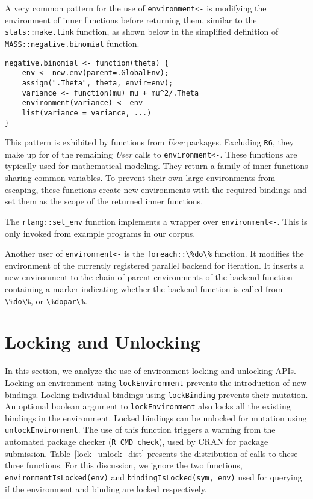 \documentclass[10pt,review,sigplan,anonymous=true,authorversion=true,nonacm=true]{acmart}
\renewcommand{\c}[1]{\lstinline |#1|\xspace}
\begin{document}
A very common pattern for the use of \c{environment<-} is modifying the
environment of inner functions before returning them, similar to the
\c{stats::make.link} function, as shown below in the simplified definition of
\c{MASS::negative.binomial} function.

\begin{lstlisting}
negative.binomial <- function(theta) {
    env <- new.env(parent=.GlobalEnv);
    assign(".Theta", theta, envir=env);
    variance <- function(mu) mu + mu^2/.Theta
    environment(variance) <- env
    list(variance = variance, ...)
}

\end{lstlisting}

This pattern is exhibited by \EnvAsnUserInnerFunFunCnt functions from
\EnvAsnUserInnerFunPackCnt \emph{User} packages. Excluding \c{R6}, they make up
for \EnvAsnUserInnerFunCallPerc of the remaining \emph{User} calls to
\c{environment<-}. These functions are typically used for mathematical modeling.
They return a family of inner functions sharing common variables. To prevent
their own large environments from escaping, these functions create new
environments with the required bindings and set them as the scope of the
returned inner functions.

The \c{rlang::set_env} function implements a wrapper over \c{environment<-}.
This is only invoked from example programs in our corpus.

Another user of \c{environment<-} is the \c{foreach::\%do\%} function. It
modifies the environment of the currently registered parallel backend for
iteration. It inserts a new environment to the chain of parent environments of
the backend function containing a marker indicating whether the backend function
is called from \c{\%do\%}, or \c{\%dopar\%}.

\section{Locking and Unlocking}

In this section, we analyze the use of environment locking and unlocking APIs.
Locking an environment using \c{lockEnvironment} prevents the introduction of
new bindings. Locking individual bindings using \c{lockBinding} prevents their
mutation. An optional boolean argument to \c{lockEnvironment} also locks all the
existing bindings in the environment. Locked bindings can be unlocked for
mutation using \c{unlockEnvironment}. The use of this function triggers a
warning from the automated package checker (\c{R CMD check}), used by CRAN for
package submission. Table~\ref{lock_unlock_dist} presents the distribution of
calls to these three functions. For this discussion, we ignore the two
functions, \c{environmentIsLocked(env)} and \c{bindingIsLocked(sym, env)} used
for querying if the environment and binding are locked respectively.
\end{document}
